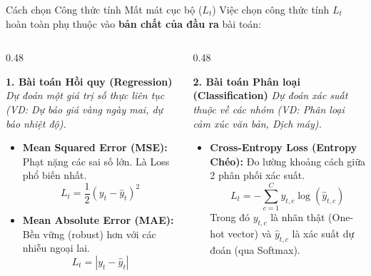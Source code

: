 \documentclass[aspectratio=169, 10pt]{beamer}
\begin{document}
\begin{frame}{Cách chọn Công thức tính Mất mát cục bộ ($L_t$)}
Việc chọn công thức tính $L_t$ hoàn toàn phụ thuộc vào \textbf{bản chất của đầu ra} bài toán:

\vspace{0.2cm}
\begin{columns}[T]
\begin{column}{0.48\textwidth}
\begin{exampleblock}{\textbf{1. Bài toán Hồi quy (Regression)}}
\textit{Dự đoán một giá trị số thực liên tục (VD: Dự báo giá vàng ngày mai, dự báo nhiệt độ).}
\begin{itemize}
    \item \textbf{Mean Squared Error (MSE):} Phạt nặng các sai số lớn. Là Loss phổ biến nhất.
    \[ L_t = \frac{1}{2}(y_t - \hat{y}_t)^2 \]
    \item \textbf{Mean Absolute Error (MAE):} Bền vững (robust) hơn với các nhiễu ngoại lai.
    \[ L_t = |y_t - \hat{y}_t| \]
\end{itemize}
\end{exampleblock}
\end{column}

\begin{column}{0.48\textwidth}
\begin{alertblock}{\textbf{2. Bài toán Phân loại (Classification)}}
\textit{Dự đoán xác suất thuộc về các nhóm (VD: Phân loại cảm xúc văn bản, Dịch máy).}
\begin{itemize}
    \item \textbf{Cross-Entropy Loss (Entropy Chéo):} Đo lường khoảng cách giữa 2 phân phối xác suất.
    \[ L_t = -\sum_{c=1}^{C} y_{t,c} \log(\hat{y}_{t,c}) \]
    \scriptsize Trong đó $y_{t,c}$ là nhãn thật (One-hot vector) và $\hat{y}_{t,c}$ là xác suất dự đoán (qua Softmax).
\end{itemize}
\end{alertblock}
\end{column}
\end{columns}
\end{frame}
\end{document}
